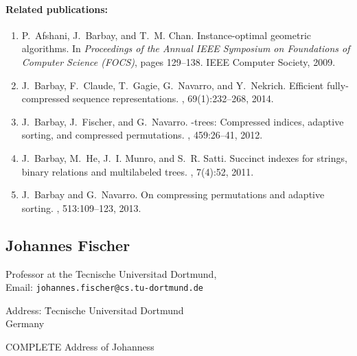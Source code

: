 \documentclass[a4paper,10pt]{article}
\begin{document}
\paragraph{Related publications:}
\begin{enumerate}
\item
P.~Afshani, J.~Barbay, and T.~M. Chan.
\newblock Instance-optimal geometric algorithms.
\newblock In {\em Proceedings of the Annual IEEE Symposium on Foundations of
  Computer Science (FOCS)}, pages 129--138. IEEE Computer Society, 2009.

\item
J.~Barbay, F.~Claude, T.~Gagie, G.~Navarro, and Y.~Nekrich.
\newblock Efficient fully-compressed sequence representations.
, 69(1):232--268, 2014.

\item
J.~Barbay, J.~Fischer, and G.~Navarro.
-trees: Compressed indices, adaptive sorting, and compressed
  permutations.
, 459:26--41,
  2012.

\item
J.~Barbay, M.~He, J.~I. Munro, and S.~R. Satti.
\newblock Succinct indexes for strings, binary relations and multilabeled
  trees.
 , 7(4):52, 2011.

\item
J.~Barbay and G.~Navarro.
\newblock On compressing permutations and adaptive sorting.
, 513:109--123, 2013.
\end{enumerate}


\subsection*{Johannes Fischer}

\begin{multicols}{2}
\noindent Professor at the Tecnische Universitad Dortmund, \\
Email: \texttt{johannes.fischer@cs.tu-dortmund.de} \\
\begin{tabbing}
Address: \=  Tecnische Universitad Dortmund \\
\> Germany
\end{tabbing}
\begin{TODO}
COMPLETE Address of Johanness
\end{TODO}
\end{multicols}
\end{document}
